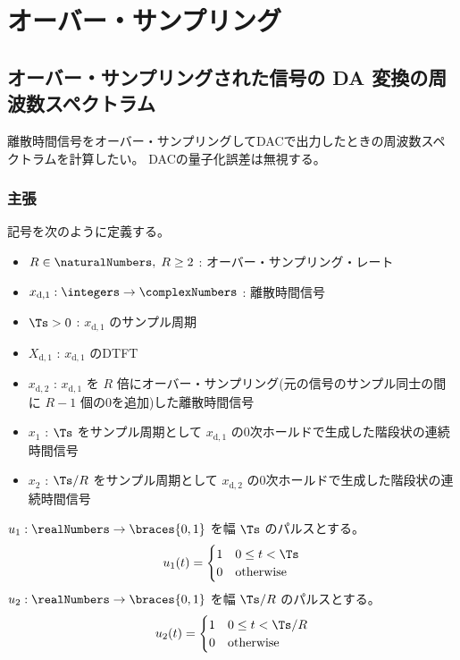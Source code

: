 \chapter{オーバー・サンプリング}
    \section{オーバー・サンプリングされた信号の DA 変換の周波数スペクトラム}
        \newcommand*{\xda}{x_{\text{d},1}}
        \newcommand*{\Xda}{X_{\text{d},1}}
        \newcommand*{\xdb}{x_{\text{d},2}}
        \newcommand*{\Xdb}{X_{\text{d},2}}
        離散時間信号をオーバー・サンプリングしてDACで出力したときの周波数スペクトラムを計算したい。
        DACの量子化誤差は無視する。
        \subsection{主張}
            記号を次のように定義する。
            \begin{itemize}
                \item $R\in\naturalNumbers,\;R\geq 2$ : オーバー・サンプリング・レート
                \item $\xda:\integers\to\complexNumbers$ : 離散時間信号
                \item $\Ts>0$ : $\xda$ のサンプル周期
                \item $\Xda$ : $\xda$ のDTFT
                \item $\xdb$ : $\xda$ を $R$ 倍にオーバー・サンプリング(元の信号のサンプル同士の間に $R-1$ 個の0を追加)した離散時間信号
                \item $x_1$ : $\Ts$ をサンプル周期として $\xda$ の0次ホールドで生成した階段状の連続時間信号
                \item $x_2$ : $\Ts/R$ をサンプル周期として $\xdb$ の0次ホールドで生成した階段状の連続時間信号
            \end{itemize}
            $u_1:\realNumbers\to\braces{0,1}$ を幅 $\Ts$ のパルスとする。
            \[
                u_1(t) = \begin{cases}
                    1 & 0\leq t < \Ts \\
                    0 & \text{otherwise}
                \end{cases}
            \]
            $u_2:\realNumbers\to\braces{0,1}$ を幅 $\Ts/R$ のパルスとする。
            \[
                u_2(t) = \begin{cases}
                    1 & 0\leq t < \Ts/R \\
                    0 & \text{otherwise}
                \end{cases}
            \]
